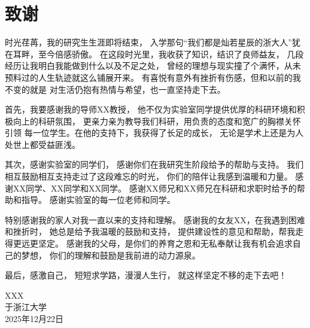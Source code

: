 \chapter{致\ZJUspace{}谢}

时光荏苒，我的研究生生涯即将结束，
入学那句“我们都是灿若星辰的浙大人”犹在耳畔，至今倍感骄傲。
在这段时光里，我收获了知识，结识了良师益友，
几段经历让我明白我能做到什么以及不足之处，
曾经的理想与现实撞了个满怀，从未预料过的人生轨迹就这么铺展开来。
有喜悦有意外有挫折有伤感，但和以前的我不变的就是
对生活仍抱有热情与希望，也一直坚持走下去。

首先，我要感谢我的导师XX教授，
他不仅为实验室同学提供优厚的科研环境和积极向上的科研氛围，
更亲力亲为教导我们科研，用负责的态度和宽广的胸襟关怀引领
每一位学生。在他的支持下，我获得了长足的成长，
无论是学术上还是为人处世上都受益匪浅。

其次，感谢实验室的同学们，
感谢你们在我研究生阶段给予的帮助与支持。
我们相互鼓励相互支持走过了这段难忘的时光，
你们的陪伴让我感到温暖和力量。
感谢XX同学、XX同学和XX同学。
感谢XX师兄和XX师兄在科研和求职时给予的帮助和指导。
感谢实验室的每一位老师和同学。

特别感谢我的家人对我一直以来的支持和理解。
感谢我的女友XX，在我遇到困难和挫折时，
她总是给予我温暖的鼓励和支持，
提供建设性的意见和帮助，帮我走得更远更坚定。
感谢我的父母，是你们的养育之恩和无私奉献让我有机会追求自己的梦想，
你们的理解和鼓励是我前进的动力源泉。

最后，感激自己，
短短求学路，漫漫人生行，
就这样坚定不移的走下去吧！

\vspace{2cm}
\hfill
\begin{minipage}{14em}
    \begin{flushright}
        XXX \\
        于浙江大学\\
        2025年12月22日\\
    \end{flushright}
\end{minipage}
